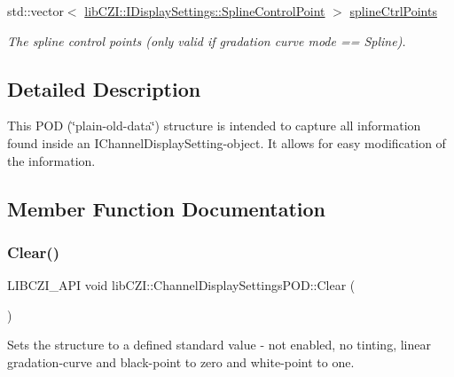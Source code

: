 \begin{DoxyCompactItemize}
\mbox{\label{structlib_c_z_i_1_1_channel_display_settings_p_o_d_ae3342d21506c44664f165e7c9cc8422e}} 
std\+::vector$<$ \hyperlink{structlib_c_z_i_1_1_i_display_settings_1_1_spline_control_point}{lib\+C\+Z\+I\+::\+I\+Display\+Settings\+::\+Spline\+Control\+Point} $>$ \hyperlink{structlib_c_z_i_1_1_channel_display_settings_p_o_d_ae3342d21506c44664f165e7c9cc8422e}{spline\+Ctrl\+Points}
\begin{DoxyCompactList}\small\item\em The spline control points (only valid if gradation curve mode == Spline). \end{DoxyCompactList}\end{DoxyCompactItemize}


\subsection{Detailed Description}
This P\+OD (\char`\"{}plain-\/old-\/data\char`\"{}) structure is intended to capture all information found inside an I\+Channel\+Display\+Setting-\/object. It allows for easy modification of the information. 

\subsection{Member Function Documentation}
\mbox{\label{structlib_c_z_i_1_1_channel_display_settings_p_o_d_a4191dc68cd622358ad1786753ebdfb24}} 
\subsubsection{\texorpdfstring{Clear()}{Clear()}}
{\footnotesize\ttfamily L\+I\+B\+C\+Z\+I\+\_\+\+A\+PI void lib\+C\+Z\+I\+::\+Channel\+Display\+Settings\+P\+O\+D\+::\+Clear (\begin{DoxyParamCaption}{ }\end{DoxyParamCaption})\hspace{0.3cm}{\ttfamily [inline]}}

Sets the structure to a defined standard value -\/ not enabled, no tinting, linear gradation-\/curve and black-\/point to zero and white-\/point to one. \mbox{\label{structlib_c_z_i_1_1_channel_display_settings_p_o_d_a1fcbd1c402caa3e365c4067882335205}} 
